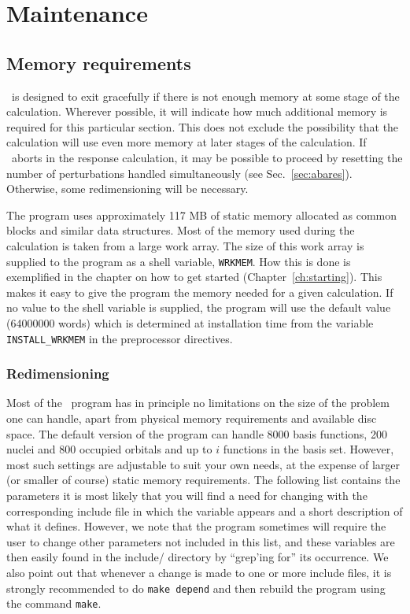 \chapter{Maintenance}\label{ch:maintain}

\section{Memory requirements}

\dalton\ is designed to exit gracefully if there is not enough
memory at some stage of the calculation.  Wherever possible, it
will indicate how much additional memory is required for this
particular section.  This does not exclude the possibility that
the calculation will use even more memory at later stages of the
calculation. If \dalton\ aborts in the response calculation, it
may be possible to proceed by resetting the number of
perturbations handled simultaneously (see 
Sec.~\ref{sec:abares}).  Otherwise, some redimensioning will be
necessary.

The program uses approximately 117 MB of static memory allocated as common
blocks and similar data structures. Most of the memory used during the
calculation is taken from a large work array. The size of this work
array is supplied to the program as a shell
variable, \verb|WRKMEM|.
How this is done is exemplified in the chapter on how to get started
(Chapter~\ref{ch:starting}). This makes it easy
to give the program the memory needed for a given calculation. If no
value to the shell 
variable is supplied, the program will use the default value
(64000000 words) which is
determined at installation time from the variable
\verb|INSTALL_WRKMEM| in the preprocessor
directives.

\subsection{Redimensioning \dalton}

Most of the \dalton\ program has in principle no limitations on
the size of the problem one can handle, apart from
physical memory requirements and available disc space. The default
version of the program can handle 8000 basis functions, 200 nuclei and
800 occupied orbitals and up to $i$ functions in the basis
set. However, most such settings are adjustable to suit your own
needs, at the expense of larger (or smaller of course) static memory
requirements. The following list contains the parameters it is
most likely that you will find a need for changing with the
corresponding include 
file in which the variable appears and a short description of what
it defines. However, we note that the program sometimes will
require the user to change other parameters not included in this
list, and these variables are then easily found in the include/
directory by ``grep'ing for'' its occurrence. We also point out that
whenever a change is made to one or more include files, it is strongly
recommended to do \verb|make depend| and then rebuild the program using the
command \verb|make|.

